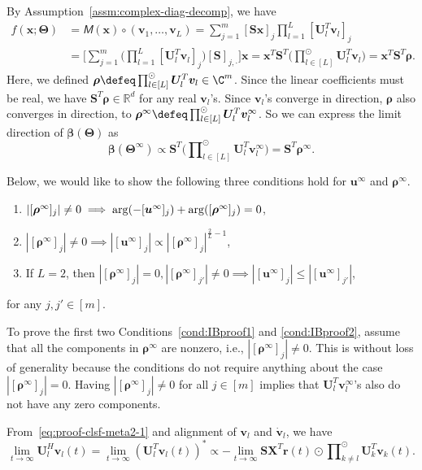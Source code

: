 \documentclass{article} %
\def\vr{{\bm{r}}}
\def\vu{{\bm{u}}}
\def\vv{{\bm{v}}}
\def\vx{{\bm{x}}}
\def\mS{{\bm{S}}}
\def\mU{{\bm{U}}}
\def\mX{{\bm{X}}}
\newcommand{\tens}[1]{\bm{\mathsfit{#1}}}
\def\tM{{\tens{M}}}
\newcommand{\R}{\mathbb{R}}
\newcommand{\vbeta}{{\bm{\beta}}}
\newcommand{\bTheta}{\bm{\Theta}}
\newcommand{\vrho}{{\bm{\rho}}}
\newcommand{\Arg}{\mathop{\rm arg}}
\begin{document}
By Assumption~\ref{assm:complex-diag-decomp}, we have
\begin{align*}
    f(\vx; \bTheta) 
    &= \tM(\vx) \circ (\vv_1, \dots, \vv_L)
    = \sum_{j=1}^m [\mS \vx]_j \prod_{l=1}^L [\mU_l^T \vv_l]_j\\
    &= \bigg[ \sum_{j=1}^m \bigg(\prod_{l=1}^L [\mU_l^T \vv_l]_j \bigg) [\mS]_{j,\cdot} \bigg ]\vx
    = \vx^T \mS^T \bigg(\prod\nolimits_{l \in [L]}^{\odot} \mU_l^T \vv_l \bigg)
    = \vx^T \mS^T \vrho.
\end{align*}
Here, we defined $\vrho \defeq \prod\nolimits_{l \in [L]}^{\odot} \mU_l^T \vv_l \in \C^m$.
Since the linear coefficients must be real, we have $\mS^T \vrho \in \R^d$ for any real $\vv_l$'s.
Since $\vv_l$'s converge in direction, $\vrho$ also converges in direction, to $\vrho^\infty \defeq \prod\nolimits_{l \in [L]}^{\odot} \mU_l^T \vv_l^\infty$.
So we can express the limit direction of $\vbeta(\bTheta)$ as
\begin{equation}
\label{eq:proof-clsf-meta2-19}
    \vbeta(\bTheta^\infty) \propto \mS^T \bigg(\prod\nolimits_{l \in [L]}^{\odot} \mU_l^T \vv_l^\infty \bigg) = \mS^T \vrho^\infty.
\end{equation}

Below, we would like to show the following three conditions hold for $\vu^\infty$ and $\vrho^\infty$.
\begin{enumerate}[label=\textup{(\alph*)}]
	\item \label{cond:IBproof1} $|[\vrho^\infty]_j| \neq 0 \implies \Arg(-[\vu^\infty]_j) + \Arg([\vrho^\infty]_j) = 0$,
	\item \label{cond:IBproof2} $|[\vrho^\infty]_j| \neq 0 \implies |[\vu^\infty]_j| \propto |[\vrho^\infty]_j|^{\frac{2}{L}-1}$,
	\item \label{cond:IBproof3} If $L = 2$, then $|[\vrho^\infty]_j| = 0, |[\vrho^\infty]_{j'}| \neq 0 \implies
	|[\vu^\infty]_j| \leq |[\vu^\infty]_{j'}|$,
\end{enumerate}
for any $j, j' \in [m]$.

To prove the first two Conditions~\ref{cond:IBproof1} and \ref{cond:IBproof2}, assume that all the components in $\vrho^\infty$ are nonzero, i.e., $|[\vrho^\infty]_j| \neq 0$. This is without loss of generality because the conditions do not require anything about the case $|[\vrho^\infty]_j| = 0$.
Having $|[\vrho^\infty]_j| \neq 0$ for all $j \in [m]$ implies that $\mU_{l}^T \vv_l^\infty$'s also do not have any zero components. 

From~\eqref{eq:proof-clsf-meta2-1} and alignment of $\vv_l$ and $\dot \vv_l$, we have
\begin{equation}
\label{eq:proof-clsf-meta2-17}
    \lim_{t \to \infty} \mU_{l}^H \vv_l(t)
    = 
    \lim_{t \to \infty} (\mU_{l}^T \vv_l(t))^*
    \propto -\lim_{t \to \infty}
    \mS\mX^T \vr(t) \odot \prod\nolimits_{k \neq l}^{\odot} \mU_k^T \vv_k(t).
\end{equation}
\end{document}

